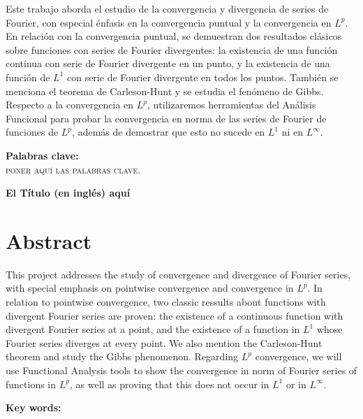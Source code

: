 \documentclass[a4paper, 12pt, oneside]{book}
\begin{document}
Este trabajo aborda el estudio de la convergencia y divergencia de series de Fourier, con especial énfasis en la convergencia puntual y la convergencia en $L^p$. En relación con la convergencia puntual, se demuestran dos resultados clásicos sobre funciones con series de Fourier divergentes: la existencia de una función continua con serie de Fourier divergente en un punto, y la existencia de una función de $L^1$ con serie de Fourier divergente en todos los puntos. También se menciona el teorema de Carleson-Hunt y se estudia el fenómeno de Gibbs. Respecto a la convergencia en $L^p$, utilizaremos herramientas del Análisis Funcional para probar la convergencia en norma de las series de Fourier de funciones de $L^p$, además de demostrar que esto no sucede en $L^1$ ni en $L^\infty$.

\vfill

\textbf{Palabras clave:}\\

\textsc{poner aquí las palabras clave.}

\pagebreak



{\let\clearpage\relax

{\Large \textbf{El Título (en inglés) aquí}}\\

\chapter*{Abstract}}

This project addresses the study of convergence and divergence of Fourier series, with special emphasis on pointwise convergence and convergence in $L^p$. In relation to pointwise convergence, two classic ressults about functions with divergent Fourier series are proven: the existence of a continuous function with divergent Fourier series at a point, and the existence of a function in $L^1$ whose Fourier series diverges at every point. We also mention the Carleson-Hunt theorem and study the Gibbs phenomenon. Regarding $L^p$ convergence, we will use Functional Analysis tools to show the convergence in norm of Fourier series of functions in $L^p$, as well as proving that this does not occur in $L^1$ or in $L^\infty$.

\vfill

\textbf{Key words:}\\
\end{document}
